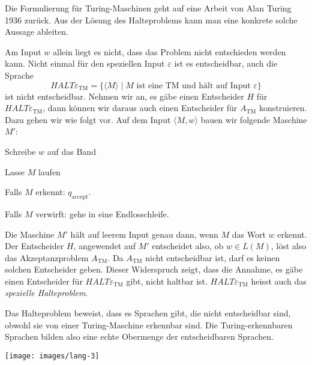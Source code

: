 Die Formulierung für Turing-Maschinen geht auf eine Arbeit von
Alan Turing 1936 zurück.
%
Aus der Lösung des Halteproblems kann
man eine konkrete solche Aussage ableiten.

Am Input $w$ allein liegt es nicht, dass das Problem nicht
entschieden werden kann.
Nicht einmal für den speziellen Input $\varepsilon$ ist es
entscheidbar, auch die Sprache
\[
\textit{HALT}\varepsilon_{\text{TM}}
=\{
\langle M\rangle \;|\;
\text{$M$ ist eine TM und hält auf Input $\varepsilon$}
\}
\]
%
ist nicht entscheidbar.
Nehmen wir an, es gäbe einen
Entscheider $H$ für $\textit{HALT}\varepsilon_{\text{TM}}$, dann können wir daraus
auch einen Entscheider für $A_{\text{TM}}$ konstruieren.
Dazu gehen wir wie folgt vor.
Auf dem Input $\langle M,w\rangle$ bauen wir folgende Maschine $M'$:
\medskip
\begin{compactenum}
\item Schreibe $w$ auf das Band
\item Lasse $M$ laufen
\item Falls $M$ erkennt: $q_{\text{accept}}$.
\item Falls $M$ verwirft: gehe in eine Endlosschleife.
\end{compactenum}
\medskip
Die Maschine $M'$ hält auf leerem Input genau dann, wenn $M$
das Wort $w$ erkennt.
Der Entscheider $H$, angewendet auf $M'$
entscheidet also, ob $w\in L(M)$, löst also das Akzeptanzproblem
$A_{\text{TM}}$.
Da $A_{\text{TM}}$ nicht entscheidbar ist, darf es keinen solchen
Entscheider geben.
Dieser Widerspruch zeigt, dass die Annahme, es
gäbe einen Entscheider für $\textit{HALT}\varepsilon_{\text{TM}}$ gibt,
nicht haltbar ist.
$\textit{HALT}\varepsilon_{\text{TM}}$ heisst
auch das {\em spezielle Halteproblem}.
%

Das Halteproblem beweist, dass es Sprachen gibt, die nicht
entscheidbar sind, obwohl sie von einer Turing-Maschine
erkennbar sind.
Die Turing-erkennbaren Sprachen bilden also eine
echte Obermenge der entscheidbaren Sprachen.
\begin{center}
\texttt{[image: images/lang-3]}
\end{center}

